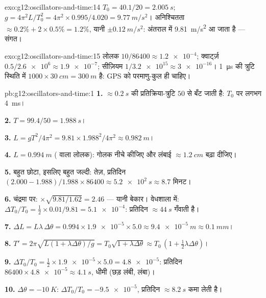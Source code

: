 \begin{solution}{exo:g12:oscillators-and-time:14}
$T_0 = 40.1/20 = \qty{2.005}{s}$; $g = 4\pi^2 L/T_0^2 = 4\pi^2
\times 0.995/4.020 = \qty{9.77}{m/s^2}$। अनिश्चितता $\approx 0.2\%
+ 2 \times 0.5\% = 1.2\%$, यानी $\pm\qty{0.12}{m/s^2}$: अंतराल में \qty{9.81}{m/s^2} आ जाता है ---
संगत।
\end{solution}

\begin{solution}{exo:g12:oscillators-and-time:15}
लोलक $10/86400 \approx \num{1.2e-4}$; क्वार्ट्ज़ $0.5/\num{2.6e6}
\approx \num{1.9e-7}$; सीज़ियम $1/\num{3.2e15} \approx \num{3e-16}$। \qty{1}{\micro s} की त्रुटि स्थिति में
$\num{1000} \times \qty{30}{cm} =
\qty{300}{m}$ है: GPS को परमाणु-कुल ही चाहिए।
\end{solution}

\begin{solution}{pb:g12:oscillators-and-time:1}
\textbf{1.} $\approx \qty{0.2}{s}$ की प्रतिक्रिया-त्रुटि $50$ से बँट जाती है: $T_0$ पर
लगभग \qty{4}{ms}।

\textbf{2.} $T = 99.4/50 = \qty{1.988}{s}$।

\textbf{3.} $L = gT^2/4\pi^2 = 9.81 \times 1.988^2/4\pi^2 \approx
\qty{0.982}{m}$।

\textbf{4.} $L = \qty{0.994}{m}$ ( वाला लोलक): गोलक नीचे कीजिए और लंबाई $\approx \qty{1.2}{cm}$ बढ़ा
दीजिए।

\textbf{5.} बहुत छोटा, इसलिए बहुत जल्दी: तेज़, प्रतिदिन $(2.000 -
1.988)/1.988 \times 86400 \approx \qty{5.2e2}{s} \approx 8.7$ मिनट।

\textbf{6.} चंद्रमा पर: $\times\sqrt{9.81/1.62} = 2.46$ --- यानी बेकार। वेधशाला में: $\Delta T_0/T_0 = \tfrac12 \times 0.01/9.81 =
\num{5.1e-4}$:
प्रतिदिन $\approx \qty{44}{s}$ गँवाती है।

\textbf{7.} $\Delta L = L\lambda\,\Delta\theta = 0.994 \times
\num{1.9e-5} \times 5.0 \approx \qty{9.4e-5}{m} \approx
\qty{0.1}{mm}$।

\textbf{8.} $T' = 2\pi\sqrt{L(1 + \lambda\Delta\theta)/g} =
T_0\sqrt{1 + \lambda\Delta\theta} \approx T_0\,(1 + \tfrac12
\lambda\Delta\theta)$।

\textbf{9.} $\Delta T_0/T_0 = \tfrac12 \times \num{1.9e-5} \times
5.0 = \num{4.8e-5}$: प्रतिदिन $86400 \times \num{4.8e-5} \approx
\qty{4.1}{s}$, धीमी (छड़ लंबी, 
लंबा)।

\textbf{10.} $\Delta\theta = \qty{-10}{K}$: $\Delta T_0/T_0 =
\num{-9.5e-5}$, प्रतिदिन $\approx \qty{8.2}{s}$ कमा लेती है।


\end{solution}
